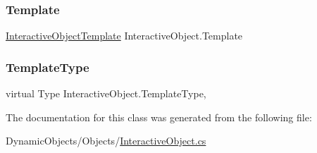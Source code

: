 \subsubsection{\texorpdfstring{Template}{Template}}
{\footnotesize\ttfamily \mbox{\hyperlink{class_interactive_object_template}{Interactive\+Object\+Template}} Interactive\+Object.\+Template\hspace{0.3cm}{\ttfamily [get]}}

\mbox{\label{class_interactive_object_ac2ffa10be1d62f9fd172e39ebf0ae87d}} 
\subsubsection{\texorpdfstring{Template\+Type}{TemplateType}}
{\footnotesize\ttfamily virtual Type Interactive\+Object.\+Template\+Type\hspace{0.3cm}{\ttfamily [get]}, {\ttfamily [protected]}}



The documentation for this class was generated from the following file\+:\begin{DoxyCompactItemize}
\item 
Dynamic\+Objects/\+Objects/\mbox{\hyperlink{_interactive_object_8cs}{Interactive\+Object.\+cs}}\end{DoxyCompactItemize}
